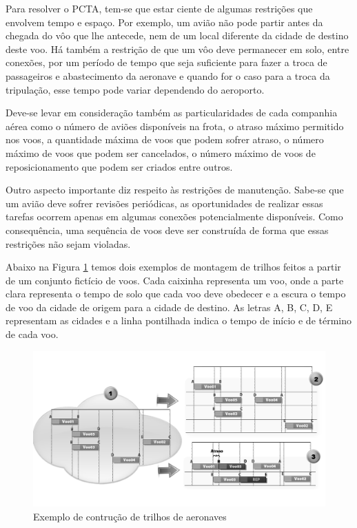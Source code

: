 \documentclass[12pt]{article}
\begin{document}
Para resolver o PCTA, tem-se que estar ciente de algumas restrições que envolvem tempo e espaço. Por exemplo, um avião não pode partir antes da chegada do vôo que lhe antecede, nem de um local diferente da cidade de destino deste voo. Há também a restrição de que um vôo deve permanecer em solo, entre conexões, por um período de tempo que seja suficiente para fazer a troca de passageiros e abastecimento da aeronave e quando for o caso para a troca da tripulação, esse tempo pode variar dependendo do aeroporto.

Deve-se levar em consideração também as particularidades de cada companhia aérea como o número de aviões disponíveis na frota, o atraso máximo permitido nos voos, a quantidade máxima de voos que podem sofrer atraso, o número máximo de voos que podem ser cancelados, o número máximo de voos de reposicionamento que podem ser criados entre outros.

Outro aspecto importante diz respeito às restrições de manutenção. Sabe-se que um avião deve sofrer revisões periódicas, as oportunidades de realizar essas tarefas ocorrem apenas em algumas conexões potencialmente disponíveis. Como consequência, uma sequência de voos deve ser construída de forma que essas restrições não sejam violadas. 

Abaixo na Figura \ref{fig:arpexample} temos dois exemplos de montagem de trilhos feitos a partir de um conjunto fictício de voos. Cada caixinha representa um voo, onde a parte clara representa o tempo de solo que cada voo deve obedecer e a escura o tempo de voo da cidade de origem para a cidade de destino. As letras A, B, C, D, E representam as cidades e a linha pontilhada indica o tempo de início e de término de cada voo.

\begin{figure}[ht]
\centering
\includegraphics[width=1\textwidth]{montagemtrilhopeb.png}
\caption{Exemplo de contrução de trilhos de aeronaves}
\label{fig:arpexample}
\end{figure}
\end{document}
